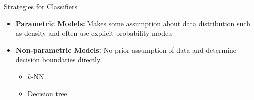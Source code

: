 \documentclass{beamer}
\begin{document}
\begin{frame}{Strategies for Classifiers}
    \begin{itemize}
        \item {\bf Parametric Models: } Makes some assumption about data distribution such as density and often use explicit probability models
        \item {\bf Non-parametric Models: } No prior assumption of data and determine decision boundaries directly.
        \begin{itemize}
            \item $k$-NN
            \item Decision tree
        \end{itemize}
    \end{itemize}
\end{frame}
\end{document}
